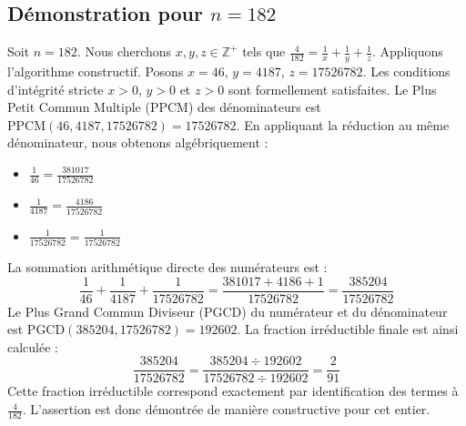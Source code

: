 \documentclass[11pt,a4paper]{article}
\begin{document}
\subsection{Démonstration pour $n = 182$}
Soit $n = 182$. Nous cherchons $x, y, z \in \mathbb{Z}^{+}$ tels que $\frac{4}{182} = \frac{1}{x} + \frac{1}{y} + \frac{1}{z}$.
Appliquons l'algorithme constructif. Posons $x = 46$, $y = 4187$, $z = 17526782$.
Les conditions d'intégrité stricte $x > 0$, $y > 0$ et $z > 0$ sont formellement satisfaites.
Le Plus Petit Commun Multiple (PPCM) des dénominateurs est $\text{PPCM}(46, 4187, 17526782) = 17526782$.
En appliquant la réduction au même dénominateur, nous obtenons algébriquement :
\begin{itemize}
    \item $\frac{1}{46} = \frac{381017}{17526782}$
    \item $\frac{1}{4187} = \frac{4186}{17526782}$
    \item $\frac{1}{17526782} = \frac{1}{17526782}$
\end{itemize}
La sommation arithmétique directe des numérateurs est :
$$ \frac{1}{46} + \frac{1}{4187} + \frac{1}{17526782} = \frac{381017 + 4186 + 1}{17526782} = \frac{385204}{17526782} $$
Le Plus Grand Commun Diviseur (PGCD) du numérateur et du dénominateur est $\text{PGCD}(385204, 17526782) = 192602$.
La fraction irréductible finale est ainsi calculée :
$$ \frac{385204}{17526782} = \frac{385204 \div 192602}{17526782 \div 192602} = \frac{2}{91} $$
Cette fraction irréductible correspond exactement par identification des termes à $\frac{4}{182}$. L'assertion est donc démontrée de manière constructive pour cet entier.
\end{document}
